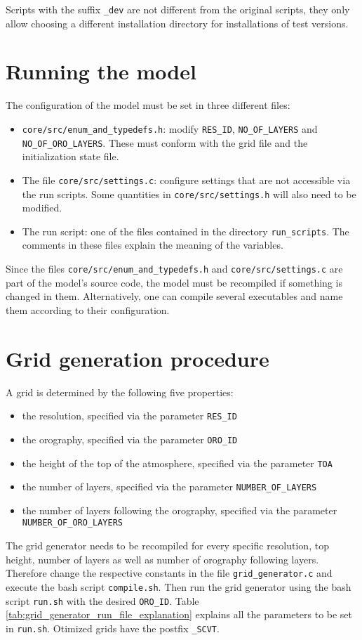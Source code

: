 \documentclass[10pt]{report}
\begin{document}
Scripts with the suffix \texttt{\_dev} are not different from the original scripts, they only allow choosing a different installation directory for installations of test versions.

\chapter{Running the model}
\label{chap:running_the_model}

The configuration of the model must be set in three different files:

\begin{itemize}
\item \texttt{core/src/enum\_and\_typedefs.h}: modify \texttt{RES\_ID}, \texttt{NO\_OF\_LAYERS} and \texttt{NO\_OF\_ORO\_LAYERS}. These must conform with the grid file and the initialization state file.
\item The file \texttt{core/src/settings.c}: configure  settings that are not accessible via the run scripts. Some quantities in \texttt{core/src/settings.h} will also need to be modified.
\item The run script: one of the files contained in the directory \texttt{run\_scripts}. The comments in these files explain the meaning of the variables.
\end{itemize}
%
Since the files \texttt{core/src/enum\_and\_typedefs.h} and \texttt{core/src/settings.c} are part of the model's source code, the model must be recompiled if something is changed in them. Alternatively, one can compile several executables and name them according to their configuration.

\chapter{Grid generation procedure}
\label{chap:grid_generation_procedure}

A grid is determined by the following five properties:

\begin{itemize}
\item the resolution, specified via the parameter \texttt{RES\_ID}
\item the orography, specified via the parameter \texttt{ORO\_ID}
\item the height of the top of the atmosphere, specified via the parameter \texttt{TOA}
\item the number of layers, specified via the parameter \texttt{NUMBER\_OF\_LAYERS}
\item the number of layers following the orography, specified via the parameter \texttt{NUMBER\_OF\_ORO\_LAYERS}
\end{itemize}
%
The grid generator needs to be recompiled for every specific resolution, top height, number of layers as well as number of orography following layers. Therefore change the respective constants in the file \texttt{grid\_generator.c} and execute the bash script \texttt{compile.sh}. Then run the grid generator using the bash script \texttt{run.sh} with the desired \texttt{\texttt{ORO\_ID}}. Table \ref{tab:grid_generator_run_file_explanation} explains all the parameters to be set in \texttt{run.sh}. Otimized grids have the postfix \texttt{\_SCVT}.
\end{document}
